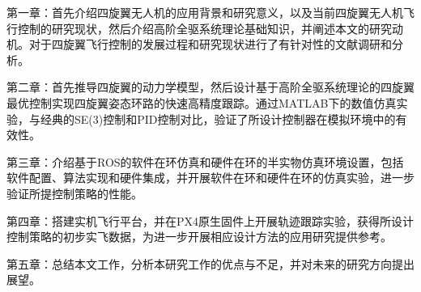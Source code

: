第一章：首先介绍四旋翼无人机的应用背景和研究意义，以及当前四旋翼无人机飞行控制的研究现状，然后介绍高阶全驱系统理论基础知识，并阐述本文的研究动机。对于四旋翼飞行控制的发展过程和研究现状进行了有针对性的文献调研和分析。

第二章：首先推导四旋翼的动力学模型，然后设计基于高阶全驱系统理论的四旋翼最优控制实现四旋翼姿态环路的快速高精度跟踪。通过MATLAB下的数值仿真实验，与经典的SE(3)控制和PID控制对比，验证了所设计控制器在模拟环境中的有效性。

第三章：介绍基于ROS的软件在环仿真和硬件在环的半实物仿真环境设置，包括软件配置、算法实现和硬件集成，并开展软件在环和硬件在环的仿真实验，进一步验证所提控制策略的性能。

第四章：搭建实机飞行平台，并在PX4原生固件上开展轨迹跟踪实验，获得所设计控制策略的初步实飞数据，为进一步开展相应设计方法的应用研究提供参考。

第五章：总结本文工作，分析本研究工作的优点与不足，并对未来的研究方向提出展望。